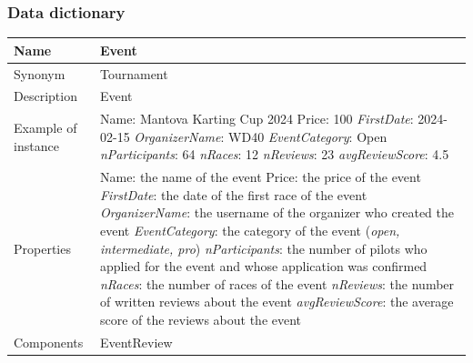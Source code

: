 \documentclass{beamer}
\begin{document}
\begin{frame}
\frametitle{Data dictionary}
\begin{table}
\tiny
\begin{tabular}{|p{2cm}|p{6cm}|}
\hline
Name & \textbf{Event} \\
\hline
Synonym & Tournament \\
\hline
Description & Event \\
\hline
Example of instance &
Name: Mantova Karting Cup 2024 \newline
Price: 100 \newline
\textit{FirstDate}: 2024-02-15 \newline
\textit{OrganizerName}: WD40 \newline
\textit{EventCategory}: Open \newline
\textit{nParticipants}: 64 \newline
\textit{nRaces}: 12 \newline
\textit{nReviews}: 23 \newline
\textit{avgReviewScore}: 4.5 \\
\hline
Properties &
Name: the name of the event \newline
Price: the price of the event \newline
\textit{FirstDate}: the date of the first race of the event \newline
\textit{OrganizerName}: the username of the organizer who created the event \newline
\textit{EventCategory}: the category of the event (\textit{open, intermediate, pro})\newline
\textit{nParticipants}: the number of pilots who applied for the event and whose application was confirmed\newline
\textit{nRaces}: the number of races of the event \newline
\textit{nReviews}: the number of written reviews about the event \newline
\textit{avgReviewScore}: the average score of the reviews about the event \\
\hline
Components & EventReview \\
\hline
\end{tabular}
\end{table}
\end{frame}
\end{document}
